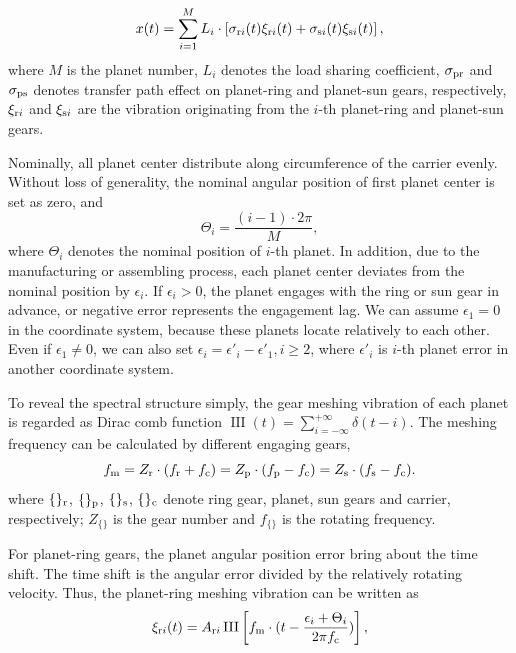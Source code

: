 \documentclass[a4paper,fleqn]{cas-sc}%
\begin{document}
\begin{equation}
    x(t)=\sum_{i=1}^{M} L_i \cdot \left[ \sigma_{{\rm r}i}(t) \xi_{{\rm r}i}(t) + \sigma_{{\rm s}i}(t) \xi_{{\rm s}i}(t) \right], \label{eq:general_signal}
\end{equation}
where $M$ is the planet number, $L_i$ denotes the load sharing coefficient, $\sigma_{\rm pr}$ and $\sigma_{\rm ps}$ denotes transfer path effect on planet-ring and planet-sun gears, respectively, $\xi_{{\rm r}i}$ and $\xi_{{\rm s}i}$ are the vibration originating from the $i$-th planet-ring and planet-sun gears.
\par Nominally, all planet center distribute along circumference of the carrier evenly. Without loss of generality, the nominal angular position of first planet center is set as zero, and
\begin{equation}
    \Theta_i=\frac{(i-1)\cdot 2\pi}{M},
\end{equation}
where $\Theta_i$ denotes the nominal position of $i$-th planet. In addition, due to the manufacturing or assembling process, each planet center deviates from the nominal position by $\epsilon_i$. If $\epsilon_i>0$, the planet engages with the ring or sun gear in advance, or negative error represents the engagement lag. We can assume $\epsilon_1=0$ in the coordinate system, because these planets locate relatively to each other. Even if $\epsilon_1 \neq 0$, we can also set $\epsilon_i=\epsilon'_i-\epsilon'_1,i \geq 2$, where $\epsilon'_i$ is $i$-th planet error in another coordinate system.
\par To reveal the spectral structure simply, the gear meshing vibration of each planet is regarded as Dirac comb function $\operatorname{III}(t)=\sum_{i=-\infty}^{+\infty}\delta(t-i)$. The meshing frequency can be calculated by different engaging gears,
\begin{equation}
    f_{\rm m}=Z_{\rm r} \cdot (f_{\rm r}+f_{\rm c})=Z_{\rm p} \cdot (f_{\rm p}-f_{\rm c})=Z_{\rm s} \cdot (f_{\rm s}-f_{\rm c}). \label{eq:meshing_frequency}
\end{equation}
where $\{\}_{\rm r}$, $\{\}_{\rm p}$, $\{\}_{\rm s}$, $\{\}_{\rm c}$ denote ring gear, planet, sun gears and carrier, respectively; $Z_{\{\}}$ is the gear number and $f_{\{\}}$ is the rotating frequency. 
\par For planet-ring gears, the planet angular position error bring about the time shift. The time shift is the angular error divided by the relatively rotating velocity. Thus, the planet-ring meshing vibration can be written as
\begin{equation}
    \xi_{{\rm r}i}(t)=A_{{\rm r}i}\operatorname{III}\left[f_{\rm m} \cdot (t-\frac{\epsilon_i+\Theta_i}{2 \pi f_{\rm c}})\right],\label{eq:planet-ring_meshing}
\end{equation}
\end{document}
